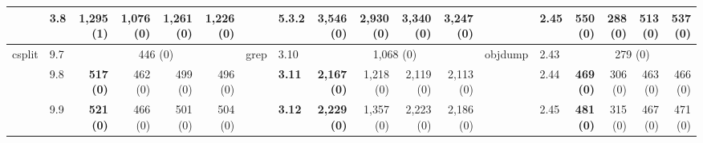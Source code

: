 \begin{table}[]
{\begin{tabular}{l|l|rrrr||l|l|rrrr||l|l|rrrr}
                                 & 3.8                          & \multicolumn{1}{r|}{\textbf{1,295 (1)}} & \multicolumn{1}{r|}{1,076 (0)} & \multicolumn{1}{r|}{1,261 (0)} & 1,226 (0)                        &                              & 5.3.2                        & \multicolumn{1}{r|}{\textbf{3,546 (0)}} & \multicolumn{1}{r|}{2,930 (0)} & \multicolumn{1}{r|}{3,340 (0)} & 3,247 (0)                        &                              & 2.45                         & \multicolumn{1}{r|}{\textbf{550 (0)}}   & \multicolumn{1}{r|}{288 (0)}   & \multicolumn{1}{r|}{513 (0)}   & 537 (0)                         \\ \midrule
    \multirow{3}{*}{csplit}      & 9.7                          & \multicolumn{4}{c||}{446 (0)}                                                                                                                 & \multirow{3}{*}{grep}        & 3.10                         & \multicolumn{4}{c||}{1,068 (0)}                                                                                                               & \multirow{3}{*}{objdump}     & 2.43                         & \multicolumn{4}{c}{279 (0)}                                                                                                                 \\ \cmidrule(lr){2-6} \cmidrule(lr){8-12} \cmidrule{14-18} 
                                 & 9.8                          & \multicolumn{1}{r|}{\textbf{517 (0)}}   & \multicolumn{1}{r|}{462 (0)}   & \multicolumn{1}{r|}{499 (0)}   & 496 (0)                          &                              & \textbf{3.11}                & \multicolumn{1}{r|}{\textbf{2,167 (0)}} & \multicolumn{1}{r|}{1,218 (0)} & \multicolumn{1}{r|}{2,119 (0)} & 2,113 (0)                        &                              & 2.44                         & \multicolumn{1}{r|}{\textbf{469 (0)}}   & \multicolumn{1}{r|}{306 (0)}   & \multicolumn{1}{r|}{463 (0)}   & 466 (0)                         \\ \cmidrule(lr){2-6} \cmidrule(lr){8-12} \cmidrule{14-18} 
                                 & 9.9                          & \multicolumn{1}{r|}{\textbf{521 (0)}}   & \multicolumn{1}{r|}{466 (0)}   & \multicolumn{1}{r|}{501 (0)}   & 504 (0)                          &                              & \textbf{3.12}                & \multicolumn{1}{r|}{\textbf{2,229 (0)}} & \multicolumn{1}{r|}{1,357 (0)} & \multicolumn{1}{r|}{2,223 (0)} & 2,186 (0)                        &                              & 2.45                         & \multicolumn{1}{r|}{\textbf{481 (0)}}   & \multicolumn{1}{r|}{315 (0)}   & \multicolumn{1}{r|}{467 (0)}   & 471 (0)                         \\ \midrule

\end{tabular}}
\end{table}
